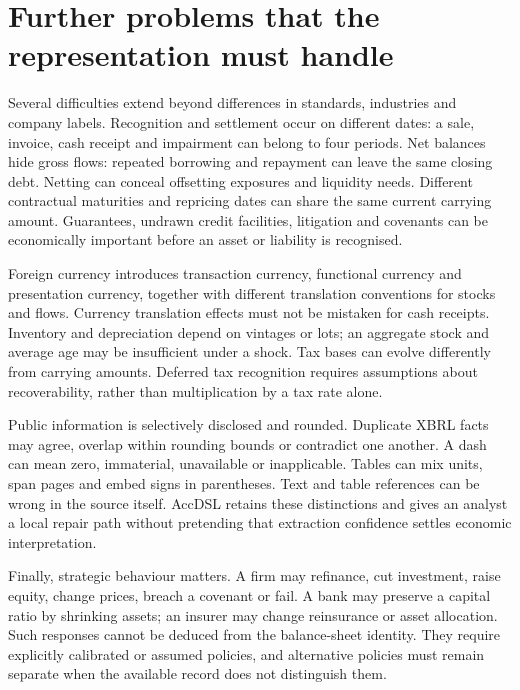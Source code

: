 \section{Further problems that the representation must handle}

Several difficulties extend beyond differences in standards, industries and
company labels. Recognition and settlement occur on different dates: a sale,
invoice, cash receipt and impairment can belong to four periods. Net balances
hide gross flows: repeated borrowing and repayment can leave the same closing
debt. Netting can conceal offsetting exposures and liquidity needs. Different
contractual maturities and repricing dates can share the same current carrying
amount. Guarantees, undrawn credit facilities, litigation and covenants can
be economically important before an asset or liability is recognised.

Foreign currency introduces transaction currency, functional currency and
presentation currency, together with different translation conventions for
stocks and flows. Currency translation effects must not be mistaken for cash
receipts. Inventory and depreciation depend on vintages or lots; an aggregate
stock and average age may be insufficient under a shock. Tax bases can evolve
differently from carrying amounts. Deferred tax recognition requires assumptions
about recoverability, rather than multiplication by a tax rate alone.

Public information is selectively disclosed and rounded. Duplicate XBRL facts
may agree, overlap within rounding bounds or contradict one another. A dash
can mean zero, immaterial, unavailable or inapplicable. Tables can mix units,
span pages and embed signs in parentheses. Text and table references can be
wrong in the source itself. AccDSL retains these distinctions and gives an
analyst a local repair path without pretending that extraction confidence
settles economic interpretation.

Finally, strategic behaviour matters. A firm may refinance, cut investment,
raise equity, change prices, breach a covenant or fail. A bank may preserve a
capital ratio by shrinking assets; an insurer may change reinsurance or asset
allocation. Such responses cannot be deduced from the balance-sheet identity.
They require explicitly calibrated or assumed policies, and alternative
policies must remain separate when the available record does not distinguish
them.
